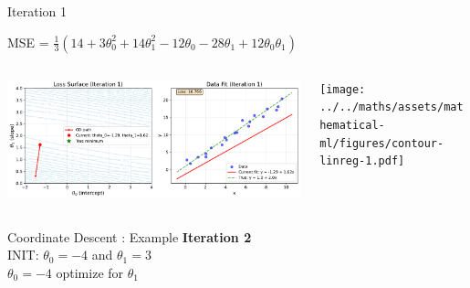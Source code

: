 \documentclass{beamer}
\begin{document}
\begin{frame}{Iteration 1}

MSE = $\frac{1}{3}(14+3\theta_{0}^{2}+14\theta_{1}^{2}-12\theta_{0}-28\theta_{1}+12\theta_{0}\theta_{1})$\\

\begin{columns}
\begin{column}{0.6\textwidth}
\begin{adjustbox}{max totalsize={\textwidth},center}
\includegraphics[width=\textwidth]{../../maths/assets/mathematical-ml/figures/gradient-descent-1.pdf}
\end{adjustbox}

\end{column}
\begin{column}{0.5\textwidth}
\begin{adjustbox}{max totalsize={\textwidth},center}
\texttt{[image: ../../maths/assets/mathematical-ml/figures/contour-linreg-1.pdf]}
\end{adjustbox}
\end{column}
\end{columns}


\end{frame}

\begin{frame}{Coordinate Descent : Example}
\textbf{Iteration 2}\\
\vspace{0.5cm}
INIT: $\theta_{0} = -4$ and  $\theta_{1}  = 3$\\

\vspace{0.5cm}
$\theta_0 = -4$ optimize for $\theta_{1}$\\ 


\end{frame}
\end{document}
